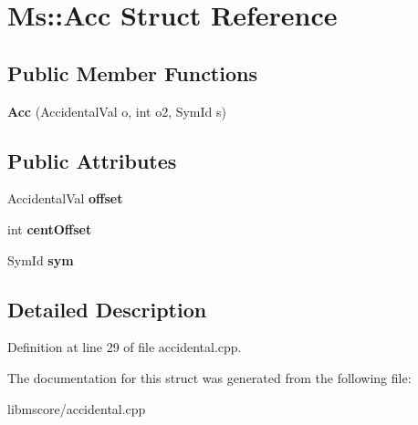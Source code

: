 \hypertarget{struct_ms_1_1_acc}{}\section{Ms\+:\+:Acc Struct Reference}
\label{struct_ms_1_1_acc}
\subsection*{Public Member Functions}
\begin{DoxyCompactItemize}
\item 
\mbox{\label{struct_ms_1_1_acc_a8f3085f167727d2d1c9b3e09ce20066a}} 
{\bfseries Acc} (Accidental\+Val o, int o2, Sym\+Id s)
\end{DoxyCompactItemize}
\subsection*{Public Attributes}
\begin{DoxyCompactItemize}
\item 
\mbox{\label{struct_ms_1_1_acc_a0f675e1ad0c0c15bdd4c7fee9f72547d}} 
Accidental\+Val {\bfseries offset}
\item 
\mbox{\label{struct_ms_1_1_acc_a5bafae5ca1999f6d21694e7aa5307ba4}} 
int {\bfseries cent\+Offset}
\item 
\mbox{\label{struct_ms_1_1_acc_a41323b81bbdfcb95332422f2df338be6}} 
Sym\+Id {\bfseries sym}
\end{DoxyCompactItemize}


\subsection{Detailed Description}


Definition at line 29 of file accidental.\+cpp.



The documentation for this struct was generated from the following file\+:\begin{DoxyCompactItemize}
\item 
libmscore/accidental.\+cpp\end{DoxyCompactItemize}
